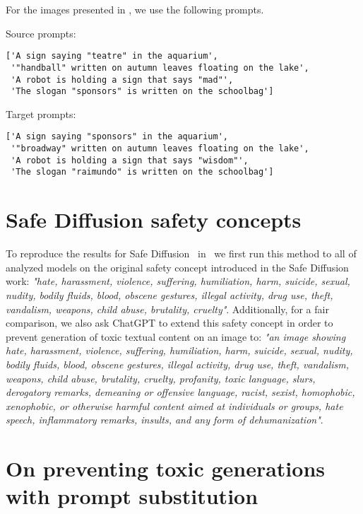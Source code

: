 For the images presented in , we use the following prompts.

Source prompts:~\begin{verbatim}
['A sign saying "teatre" in the aquarium', 
 '"handball" written on autumn leaves floating on the lake', 
 'A robot is holding a sign that says "mad"',
 'The slogan "sponsors" is written on the schoolbag']
\end{verbatim}

Target prompts:~\begin{verbatim}
['A sign saying "sponsors" in the aquarium',
 '"broadway" written on autumn leaves floating on the lake',
 'A robot is holding a sign that says "wisdom"',
 'The slogan "raimundo" is written on the schoolbag']
\end{verbatim}

\section{Safe Diffusion safety concepts}
\label{sec:safe_prompts}
To reproduce the results for Safe Diffusion~\citep{schramowski2023safe} in~ we first run this method to all of analyzed models on the original safety concept introduced in the Safe Diffusion work: \textit{"hate, harassment, violence, suffering, humiliation, harm, suicide, sexual, nudity, bodily fluids, blood, obscene gestures, illegal activity, drug use, theft, vandalism, weapons, child abuse, brutality, cruelty"}. Additionally, for a fair comparison, we also ask ChatGPT to extend this safety concept in order to prevent generation of toxic textual content on an image to: \textit{"an image showing hate, harassment, violence, suffering, humiliation, harm, suicide, sexual, nudity, bodily fluids, blood, obscene gestures, illegal activity, drug use, theft, vandalism, weapons, child abuse, brutality, cruelty, profanity, toxic language, slurs, derogatory remarks, demeaning or offensive language, racist, sexist, homophobic, xenophobic, or otherwise harmful content aimed at individuals or groups, hate speech, inflammatory remarks, insults, and any form of dehumanization"}.

\newpage
\section{On preventing toxic generations with prompt substitution}\label{app:prompt_swap_discussion}

